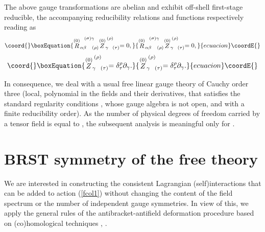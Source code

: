 \documentclass[a4paper,12pt]{article}
\begin{document}
The above gauge transformations are abelian and exhibit off-shell
first-stage reducible, the accompanying reducibility relations and functions
respectively reading as 
\begin{equation}\coord{}\boxEquation{
\stackrel{(0)}{R}_{\alpha \beta \;\;\;\;(\rho )}^{\;\;\;(\sigma )\gamma }
\stackrel{(0)}{Z}_{\gamma \;\;\;(\tau )}^{\;(\rho )}=0,  \label{fcol5}
}{
\stackrel{(0)}{R}_{\alpha \beta \;\;\;\;(\rho )}^{\;\;\;(\sigma )\gamma }
\stackrel{(0)}{Z}_{\gamma \;\;\;(\tau )}^{\;(\rho )}=0,  }{ecuacion}\coordE{}\end{equation}
\begin{equation}\coord{}\boxEquation{
\stackrel{(0)}{Z}_{\gamma \;\;\;(\tau )}^{\;(\rho )}=\delta _{\tau }^{\rho
}\partial _{\gamma }.  \label{fcol6}
}{
\stackrel{(0)}{Z}_{\gamma \;\;\;(\tau )}^{\;(\rho )}=\delta _{\tau }^{\rho
}\partial _{\gamma }.  }{ecuacion}\coordE{}\end{equation}

In consequence, we deal with a usual free linear gauge theory of Cauchy
order three (local, polynomial in the fields and their derivatives, that
satisfies the standard regularity conditions \cite{32and12}, whose gauge
algebra is not open, and with a finite reducibility order). As the number of
physical degrees of freedom carried by a tensor field \coordHE{} is equal to \coordHE{},
the subsequent analysis is meaningful only for \coordHE{}.

\section{BRST symmetry of the free theory}

We are interested in constructing the consistent Lagrangian
(self)interactions that can be added to action (\ref{fcol1}) without
changing the content of the field spectrum or the number of independent
gauge symmetries. In view of this, we apply the general rules of the
antibracket-antifield deformation procedure based on (co)homological
techniques \cite{17and5}, \cite{21and5}.
\end{document}
